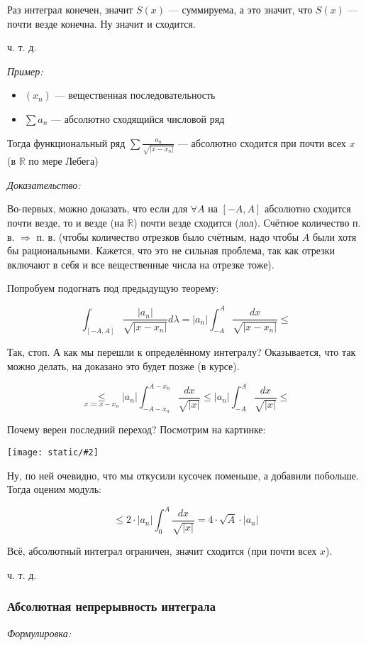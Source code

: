 \documentclass{article}
\def\images#1#2{\begin{center}\texttt{[image: static/\#2]}\end{center}}
\begin{document}
Раз интеграл конечен, значит $S(x)$ --- суммируема, а это значит, что $S(x)$ --- почти везде конечна. Ну значит и сходится.

ч. т. д.

\textit{Пример: }

\begin{itemize}
    \item $(x_n)$ --- вещественная последовательность
    \item $\sum a_n$ --- абсолютно сходящийся числовой ряд
\end{itemize}

Тогда функциональный ряд $\sum \frac{a_n}{\sqrt{|x - x_n|}}$  --- абсолютно сходится при почти всех $x$ (в $\mathbb{R}$ по мере Лебега)

\textit{Доказательство: }

Во-первых, можно доказать, что если для $\forall A$ на $[-A, A]$ абсолютно сходится почти везде, то и везде (на $\mathbb{R}$) почти везде сходится (лол). Счётное количество п. в. $\Rightarrow$ п. в. (чтобы количество отрезков было счётным, надо чтобы $A$ были хотя бы рациональными. Кажется, что это не сильная проблема, так как отрезки включают в себя и все вещественные числа на отрезке тоже).

Попробуем подогнать под предыдущую теорему: 

\[\int_{[-A, A]}\frac{|a_n|}{\sqrt{|x - x_n|}} d\lambda = |a_n| \int_{-A}^{A} \frac{dx}{\sqrt{|x - x_n|}} \le\]

Так, стоп. А как мы перешли к определённому интегралу? Оказывается, что так можно делать, на доказано это будет позже (в курсе).

\[\underset{x := x - x_n}{\le} |a_n| \int_{-A - x_n}^{A - x_n} \frac{dx}{\sqrt{|x|}} \le |a_n| \int_{-A}^{A} \frac{dx}{\sqrt{|x|}} \le\]

Почему верен последний переход? Посмотрим на картинке: 

\images{0.5}{sh_pol_r.png}

Ну, по ней очевидно, что мы откусили кусочек поменьше, а добавили побольше. Тогда оценим модуль: 

\[ \le 2 \cdot |a_n| \int_{0}^{A}\frac{dx}{\sqrt{|x|}} = 4 \cdot \sqrt{A} \cdot |a_n|\]

Всё, абсолютный интеграл ограничен, значит сходится (при почти всех $x$).

ч. т. д. 

\subsubsection{Абсолютная непрерывность интеграла}
\textit{Формулировка:}
\end{document}
